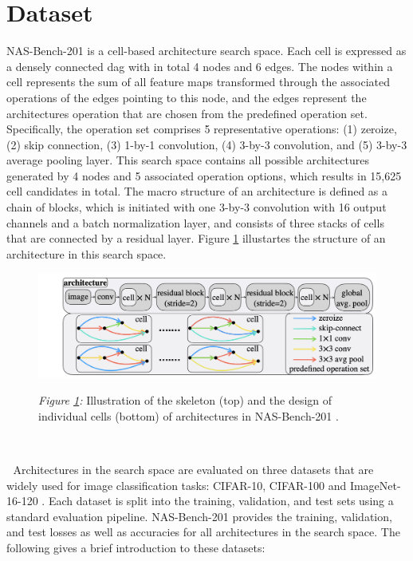 \documentclass[a4paper,oneside,bibliography=totoc]{scrbook}
\begin{document}
\section{Dataset}
\label{sec: dataset}
NAS-Bench-201 is a cell-based architecture search space. Each cell is expressed as a densely connected \gls{dag} with in total 4 nodes and 6 edges. The nodes within a cell represents the sum of all feature maps transformed through the associated operations of the edges pointing to this node, and the edges represent the architectures operation that are chosen from the predefined operation set. Specifically, the operation set comprises 5 representative operations: (1) zeroize, (2) skip connection, (3) 1-by-1 convolution, (4) 3-by-3 convolution, and (5) 3-by-3 average pooling layer. This search space contains all possible architectures generated by 4 nodes and 5 associated operation options, which results in 15,625 cell candidates in total. The macro structure of an architecture is defined as a chain of blocks, which is initiated with one 3-by-3 convolution with 16 output channels and a batch normalization layer, and consists of three stacks of cells that are connected by a residual layer. Figure \ref{fig: nasbench201} illustartes the structure of an architecture in this search space.  
	\vspace{0.5em}	
	\begin{figure}[bthp]
		\centering
		\includegraphics[scale=0.48]{figs/nas_bench_201.png}
		\label{fig: nasbench201}
			\parbox{\linewidth}{
	 		\vspace{0.7em}
 	 		{\small \textit{Figure \ref{fig: nasbench201}:} Illustration of the skeleton (top) and the design of individual cells (bottom) of architectures in NAS-Bench-201 \cite{dong2020nasbench201}.
 	 		}
 		}
	\end{figure}
\newline

\newline
Architectures in the search space are evaluated on three datasets that are widely used for image classification tasks: CIFAR-10, CIFAR-100 \cite{krizhevsky2009learning} and ImageNet-16-120 \cite{chrabaszcz2017downsampled}. Each dataset is split into the training, validation, and test sets using a standard evaluation pipeline. NAS-Bench-201 provides the training, validation, and test losses as well as accuracies for all architectures in the search space. The following gives a brief introduction to these datasets:
\end{document}
